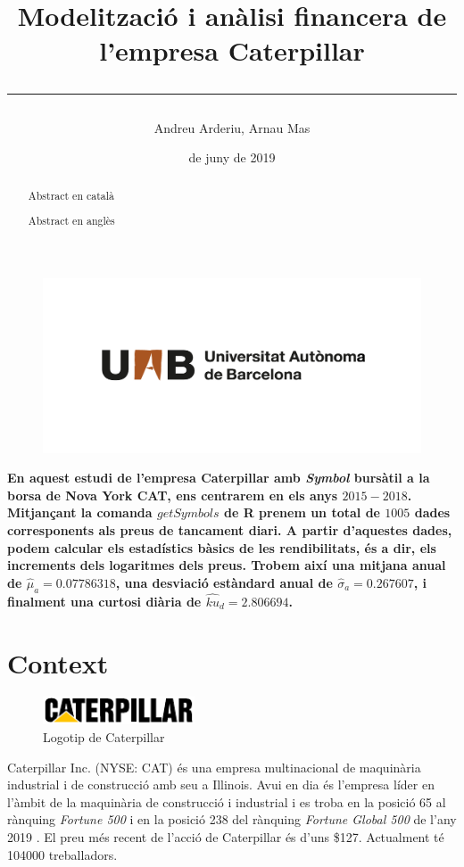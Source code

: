 \documentclass{article}
\title{\sffamily \bfseries Modelització i anàlisi financera de l'empresa Caterpillar \vspace{1em} \hrule}
\author{\sffamily Andreu Arderiu, Arnau Mas}
\date{\sffamily 14 de juny de 2019}
\numberwithin{table}{section}
\numberwithin{figure}{section}
\numberwithin{equation}{section}
\begin{document}
\begin{titlepage}
	\clearpage
	\thispagestyle{empty}
	\maketitle	

	\renewcommand{\abstractname}{\bfseries \sffamily Resum:}
	\begin{abstract}
		Abstract en català
	\end{abstract}

	\renewcommand{\abstractname}{\bfseries \sffamily Abstract:}
	\begin{abstract}
		Abstract en anglès
	\end{abstract}

	\begin{figure}[b]
		\thispagestyle{empty}
		\center \includegraphics[scale = 0.3]{uab}
	\end{figure}
\end{titlepage}

\textbf{En aquest estudi de l'empresa Caterpillar amb \textit{Symbol} bursàtil a la borsa de Nova York CAT, ens centrarem en els anys $2015-2018$. Mitjançant la comanda $getSymbols$ de R prenem un total de $1005$ dades corresponents als preus de tancament diari. A partir d'aquestes dades, podem calcular els estadístics bàsics de les rendibilitats, és a dir, els increments dels logaritmes dels preus. Trobem així una mitjana anual de $\hat{\mu}_a=0.07786318$, una desviació estàndard anual de $\hat{\sigma}_a=0.267607$, i finalment una curtosi diària de $\hat{ku}_d=2.806694$. }
\section{Context}
\begin{figure}[htb]
	\centering \small \sffamily
	\includegraphics[width=0.4\textwidth]{cat-logo}
	\caption{Logotip de Caterpillar}
	\label{fig:logo}
\end{figure}
Caterpillar Inc. (NYSE: CAT) és una empresa multinacional de maquinària industrial i de construcció amb seu a Illinois. Avui en dia és l'empresa líder en l'àmbit de la maquinària de construcció i industrial \cite{cat} i es troba en la posició 65 al rànquing \emph{Fortune 500} i en la posició 238 del rànquing \emph{Fortune Global 500} de l'any 2019 \cite{fortune,global}. El preu més recent de l'acció de Caterpillar és d'uns \$127. Actualment té \num{104000} treballadors. 
\end{document}
